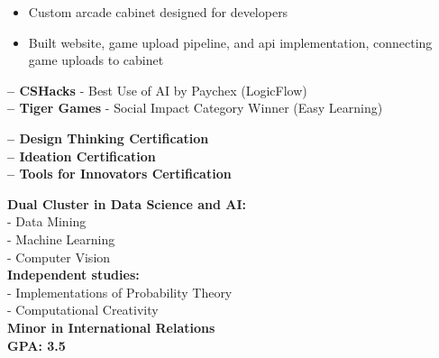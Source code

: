 \documentclass[10pt,a4paper,ragged2e,withhyper]{altacv}
\begin{document}
\begin{paracol}{2}
\divider

\begin{itemize}
    \item Custom arcade cabinet designed for developers
    \item Built website, game upload pipeline, and api implementation, connecting game uploads to cabinet
\end{itemize}\par



\textbf{ -- CSHacks} - Best Use of AI by Paychex (LogicFlow)\\
\textbf{ -- Tiger Games} - Social Impact Category Winner (Easy Learning)\\

\divider

\textbf{ -- Design Thinking Certification}\\
\textbf{ -- Ideation Certification}\\
\textbf{ -- Tools for Innovators Certification}

\switchcolumn


\textbf{Dual Cluster in Data Science and AI:}\\
 - Data Mining\\
 - Machine Learning\\
 - Computer Vision\\
\textbf{Independent studies:\\}
 - Implementations of Probability Theory\\
 - Computational Creativity\\
\textbf{Minor in International Relations}\\
\textbf{GPA: 3.5}\\

\medskip


\par\smallskip
{}
\par\smallskip
\divider


\end{paracol}
\end{document}
